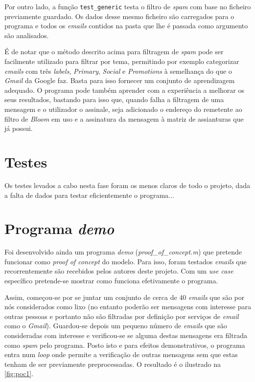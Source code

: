 \documentclass[a4paper,11pt,openright,oneside]{report}
\begin{document}
Por outro lado, a função \texttt{test\_generic} testa o filtro de \textit{spam} com base no ficheiro previamente guardado. Os dados desse mesmo ficheiro são carregados para o programa e todos os \textit{emails} contidos na pasta que lhe é passada como argumento são analisados.

É de notar que o método descrito acima para filtragem de \textit{spam} pode ser facilmente utilizado para filtrar por tema, permitindo por exemplo categorizar \textit{emails} com três \textit{labels}, \textit{Primary}, \textit{Social} e \textit{Promotions} à semelhança do que o \textit{Gmail} da Google faz. Basta para isso fornecer um conjunto de aprendizagem adequado. O programa pode também aprender com a experiência a melhorar os seus resultados, bastando para isso que, quando falha a filtragem de uma mensagem e o utilizador o assinale, seja adicionado o endereço do remetente ao filtro de \textit{Bloom} em uso e a assinatura da mensagem à matriz de assianturas que já possui.

\section{Testes}

Os testes levados a cabo nesta fase foram os menos claros de todo o projeto, dada a falta de dados para testar eficientemente o programa...

\section{Programa \textit{demo}}

Foi desenvolvido ainda um programa \textit{demo} (\textit{proof\_of\_concept.m})  que pretende funcionar como \textit{proof of concept} do modelo. Para isso, foram testados \textit{emails} que recorrentemente são recebidos pelos autores deste projeto. Com um \textit{use case} específico pretende-se mostrar como funciona efetivamente o programa.

Assim, começou-se por se juntar um conjunto de cerca de 40 \textit{emails} que são por nós considerados como lixo (no entanto poderão ser mensagens com interesse para outras pessoas e portanto não são filtradas por definição por serviços de \textit{email} como o \textit{Gmail}). Guardou-se depois um pequeno número de \textit{emails} que são consideradas com interesse e verificou-se se alguma destas mensagens era filtrada como \textit{spam} pelo programa. Posto isto e para efeitos demonstrativos, o programa entra num \textit{loop} onde permite a verificação de outras mensagens sem que estas tenham de ser previamente preprocessadas. O resultado é o ilustrado na \autoref{fig:poc1}.
\end{document}
